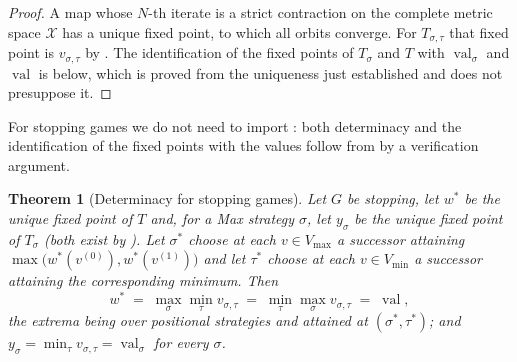\documentclass[11pt]{article}
\theoremstyle{plain}
\newtheorem{theorem}{Theorem}[section]
\theoremstyle{definition}
\DeclareMathOperator{\val}{val}
\newcommand{\Vmax}{V_{\max}}
\newcommand{\Vmin}{V_{\min}}
\begin{document}
\begin{proof}
A map whose $N$-th iterate is a strict contraction on the complete metric
space $\mathcal{X}$ has a unique fixed point, to which all orbits
converge. For $T_{\sigma,\tau}$ that fixed point is $v_{\sigma,\tau}$ by
. The identification of the fixed points of $T_\sigma$ and
$T$ with $\val_\sigma$ and $\val$ is 
below, which is proved from the uniqueness just established and does not
presuppose it.
\end{proof}

For stopping games we do not need to import : both
determinacy and the identification of the fixed points with the values
follow from  by a verification argument.

\begin{theorem}[Determinacy for stopping games]\label{thm:stopping-determinacy}
Let $G$ be stopping, let $w^\ast$ be the unique fixed point of $T$ and,
for a Max strategy $\sigma$, let $y_\sigma$ be the unique fixed point of
$T_\sigma$ (both exist by ). Let $\sigma^\ast$
choose at each $v\in\Vmax$ a successor attaining
$\max\bigl(w^\ast(v^{(0)}),w^\ast(v^{(1)})\bigr)$ and let $\tau^\ast$
choose at each $v\in\Vmin$ a successor attaining the corresponding
minimum. Then
\[
  w^\ast\;=\;\max_\sigma\min_\tau v_{\sigma,\tau}\;=\;\min_\tau\max_\sigma v_{\sigma,\tau}\;=\;\val ,
\]
the extrema being over positional strategies and attained at
$(\sigma^\ast,\tau^\ast)$; and $y_\sigma=\min_\tau v_{\sigma,\tau}=\val_\sigma$
for every $\sigma$.
\end{theorem}
\end{document}

